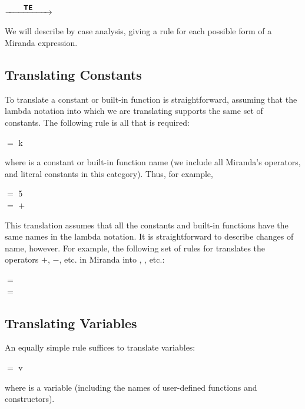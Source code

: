 \begin{center}
     $\xrightarrow{\qquad\text{\normalsize {\sffamily\footnotesize \bfseries TE}}\qquad}$ 
\end{center}

\noindent We will describe  by case analysis, giving a rule for each possible form of a
Miranda expression.


\subsection{Translating Constants}
To translate a constant or built-in function is straightforward, assuming that the lambda notation into which we are translating supports the same set of constants. The following rule is all that is required:
\begin{mlcoded}
     $=$ k
\end{mlcoded}
\noindent where  is a constant or built-in function name (we include all Miranda's operators, and literal constants in this category). Thus, for example,

\begin{mlcoded}
     $=$ 5 \\
     $=$ $+$
\end{mlcoded}

This translation assumes that all the constants and built-in functions have the same names in the lambda notation. It is straightforward to describe changes of name, however. For example, the following set of rules for  translates the operators $+$, $-$, etc. in Miranda into , , etc.:

\begin{mlcoded}
     $=$  \\
     $=$ \\
\end{mlcoded}

\subsection{Translating Variables}
An equally simple rule suffices to translate variables:

\begin{mlcoded}
     $=$ v
\end{mlcoded}
where  is a variable (including the names of user-defined functions and constructors).

